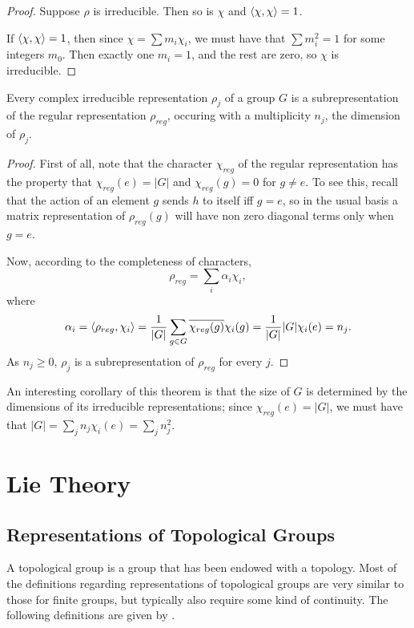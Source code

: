 \documentclass[a4paper]{article}
\begin{document}
\begin{proof}
    Suppose $\rho$ is irreducible. Then so is $\chi$ and $\left\langle \chi , \chi \right\rangle = 1$. 

    If $\left\langle \chi , \chi \right\rangle = 1$, then since $\chi = \sum m_i \chi_i$, we must have that $\sum m_i^2 = 1$ for some integers $m_0$. Then exactly one $m_i=1$, and the rest are zero, so $\chi$ is irreducible.
\end{proof}

\begin{thm}
    Every complex irreducible representation $\rho_j$ of a group $G$ is a subrepresentation of the regular representation $\rho_{reg}$, occuring with a multiplicity $n_j$, the dimension of $\rho_j$.
\end{thm}

\begin{proof}
    First of all, note that the character $\chi_{reg}$ of the regular representation has the property that $\chi_{reg}(e) = |G|$ and $\chi_{reg}(g) = 0$ for $g \neq e$. To see this, recall that the action of an element $g$ sends $h$ to itself iff $g = e$, so in the usual basis a matrix representation of $\rho_{reg}(g)$ will have non zero diagonal terms only when $g = e$. 
    
    Now, according to the completeness of characters,
    $$\rho_{reg} = \sum_i \alpha_i \chi_i,$$
    where $$\alpha_i = \left\langle \rho_{reg} , \chi_i \right\rangle = \frac{1}{|G|}\sum_{g\in G} \overline{\chi_{reg}(g)} \chi_i(g) = \frac{1}{|G|} |G| \chi_i(e) = n_j.$$
    As $n_j \geq 0$, $\rho_j$ is a subrepresentation of $\rho_{reg}$ for every $j$.
\end{proof}

An interesting corollary of this theorem is that the size of $G$ is determined by the dimensions of its irreducible representations; since $\chi_{reg}(e) = |G|$, we must have that $|G| = \sum_{j} n_j \chi_i(e) = \sum_{j} n_j^2$.

\newpage
\section{Lie Theory}
\subsection{Representations of Topological Groups}
A topological group is a group that has been endowed with a topology. Most of the definitions regarding representations of topological groups are very similar to those for finite groups, but typically also require some kind of continuity. 
The following definitions are given by \cite{alex}.
\end{document}
